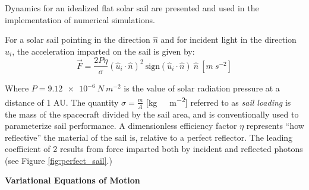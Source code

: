 Dynamics for an idealized flat solar sail are presented and used in the implementation of numerical simulations.

For a solar sail pointing in the direction \(\hat{n}\) and for incident light in the direction \(\hat{u}_i\), the acceleration imparted on the sail is given by:
\begin{equation}
    \vec{F} = \frac{2 P \eta}{\sigma}(\hat{u}_i \cdot \hat{n})^2 \ \mathrm{sign}(\hat{u}_i \cdot \hat{n}) \ \hat{n}
    \ [\unit{m\ s^{-2}}] \label{eq:solar_force}
\end{equation}

Where \(P = \qty{9.12e-6}{N\ m^{-2}}\) is the value of solar radiation pressure at a distance of 1 AU. The quantity \(\sigma = \frac{m}{A}\) [\unit{kg\ m^{-2}}] referred to as \textit{sail loading} is the mass of the spacecraft divided by the sail area, and is conventionally used to parameterize sail performance. A dimensionless efficiency factor \(\eta\) represents ``how reflective'' the material of the sail is, relative to a perfect reflector. The leading coefficient of 2 results from force imparted both by incident and reflected photons (see Figure \ref{fig:perfect_sail}.)

\textbf{Variational Equations of Motion}


